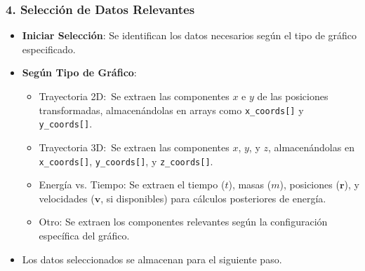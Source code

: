 \subsubsection*{4. Selección de Datos Relevantes}
\begin{itemize}
    \item \textbf{Iniciar Selección}: Se identifican los datos necesarios según el tipo de gráfico especificado.
    \item \textbf{Según Tipo de Gráfico}:
    \begin{itemize}
        \item Trayectoria 2D:\ Se extraen las componentes $x$ e $y$ de las posiciones transformadas, almacenándolas en arrays como \texttt{x\_coords[]} y \texttt{y\_coords[]}.
        \item Trayectoria 3D:\ Se extraen las componentes $x$, $y$, y $z$, almacenándolas en \texttt{x\_coords[]}, \texttt{y\_coords[]}, y \texttt{z\_coords[]}.
        \item Energía vs. Tiempo: Se extraen el tiempo ($t$), masas ($m$), posiciones ($\mathbf{r}$), y velocidades ($\mathbf{v}$, si disponibles) para cálculos posteriores de energía.
        \item Otro: Se extraen los componentes relevantes según la configuración específica del gráfico.
    \end{itemize}
    \item Los datos seleccionados se almacenan para el siguiente paso.
\end{itemize}

